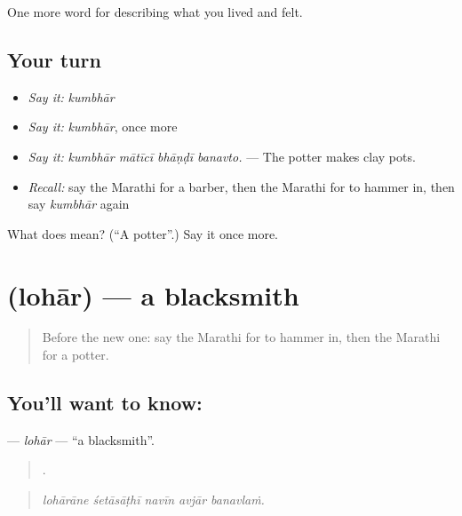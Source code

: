 \begin{grammarlens}[title={What you've built}]
One more word for describing what you lived and felt.
\end{grammarlens}

\subsection*{Your turn}
\begin{itemize}
\raggedright
  \item \emph{Say it:} \emph{kumbhār}
  \item \emph{Say it:} \emph{kumbhār}, once more
  \item \emph{Say it:} \emph{kumbhār mātīcī bhāṇḍī banavto.} — The potter makes clay pots.
  \item \emph{Recall:} say the Marathi for a barber, then the Marathi for to hammer in, then say \emph{kumbhār} again
\end{itemize}

\begin{tcolorbox}[breakable,colback=teal!4,colframe=teal!35!black,title={Before you move on}]
What does  mean? (\textquotedblleft{}A potter\textquotedblright{}.) Say it once more.
\end{tcolorbox}
\section[\texorpdfstring{\mr{लोहार} (lohār)}{लोहार (lohār)}]{ (lohār) — a blacksmith}

\label{lesson:MR-C505-lohar}



\begin{quote}
Before the new one: say the Marathi for to hammer in, then the Marathi for a potter.
\end{quote}

\subsection*{You'll want to know: }
\textbf{} — \emph{lohār} — \textquotedblleft{}a blacksmith\textquotedblright{}.

\begin{quote}
    .
\end{quote}

\begin{quote}
\emph{lohārāne śetāsāṭhī navīn avjār banavlaṁ.}
\end{quote}

